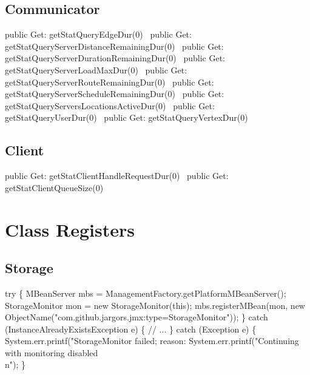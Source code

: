 \subsection{Communicator}
\nwenddocs{}\plusendmoddef
public \LA{}Get: getStatQueryEdgeDur(0)~{\nwtagstyle{}}\RA{}
public \LA{}Get: getStatQueryServerDistanceRemainingDur(0)~{\nwtagstyle{}}\RA{}
public \LA{}Get: getStatQueryServerDurationRemainingDur(0)~{\nwtagstyle{}}\RA{}
public \LA{}Get: getStatQueryServerLoadMaxDur(0)~{\nwtagstyle{}}\RA{}
public \LA{}Get: getStatQueryServerRouteRemainingDur(0)~{\nwtagstyle{}}\RA{}
public \LA{}Get: getStatQueryServerScheduleRemainingDur(0)~{\nwtagstyle{}}\RA{}
public \LA{}Get: getStatQueryServersLocationsActiveDur(0)~{\nwtagstyle{}}\RA{}
public \LA{}Get: getStatQueryUserDur(0)~{\nwtagstyle{}}\RA{}
public \LA{}Get: getStatQueryVertexDur(0)~{\nwtagstyle{}}\RA{}
\nwendcode{}\nwdocspar

\subsection{Client}
\nwenddocs{}\plusendmoddef
public \LA{}Get: getStatClientHandleRequestDur(0)~{\nwtagstyle{}}\RA{}
public \LA{}Get: getStatClientQueueSize(0)~{\nwtagstyle{}}\RA{}
\nwendcode{}\nwdocspar

\section{Class Registers}
\subsection{Storage}
\nwenddocs{}\endmoddef{}
try \{
  MBeanServer mbs = ManagementFactory.getPlatformMBeanServer();
  StorageMonitor mon = new StorageMonitor(this);
  mbs.registerMBean(mon, new ObjectName("com.github.jargors.jmx:type=StorageMonitor"));
\} catch (InstanceAlreadyExistsException e) \{
  // ...
\} catch (Exception e) \{
  System.err.printf("StorageMonitor failed; reason: %
  System.err.printf("Continuing with monitoring disabled\\n");
\}
\nwendcode{}\nwdocspar

